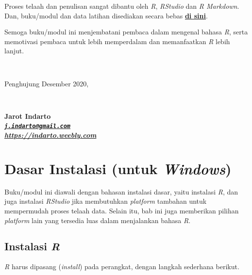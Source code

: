 \documentclass[
  12pt,
  a4paper,
]{scrbook}
\begin{document}
Proses telaah dan penulisan sangat dibantu oleh \emph{R}, \emph{RStudio}
dan \emph{R Markdown}. Dan, buku/modul dan data latihan disediakan
secara bebas
\href{https://indarto.weebly.com/7/9/1/0/7910347/dasar_r.pdf}{\textbf{di
sini}}.

Semoga buku/modul ini menjembatani pembaca dalam mengenal bahasa
\emph{R}, serta memotivasi pembaca untuk lebih memperdalam dan
memanfaatkan \emph{R} lebih lanjut.

~ ~ ~

Penghujung Desember 2020,

~

\textbf{Jarot Indarto}\\
\textbf{\emph{\href{mailto:j.indarto@gmail.com}{\nolinkurl{j.indarto@gmail.com}}}}\\
\textbf{\emph{\url{https://indarto.weebly.com}}}

\newpage

\hypertarget{dasar-instalasi-untuk-windows}{%
\chapter{\texorpdfstring{Dasar Instalasi (untuk
\emph{Windows})}{Dasar Instalasi (untuk Windows)}}\label{dasar-instalasi-untuk-windows}}

Buku/modul ini diawali dengan bahasan instalasi dasar, yaitu instalasi
\emph{R}, dan juga instalasi \emph{RStudio} jika membutuhkan
\emph{platform} tambahan untuk mempermudah proses telaah data. Selain
itu, bab ini juga memberikan pilihan \emph{platform} lain yang tersedia
luas dalam menjalankan bahasa \emph{R}.

\hypertarget{instalasi-r}{%
\section{\texorpdfstring{Instalasi
\emph{R}}{Instalasi R}}\label{instalasi-r}}

\emph{R} harus dipasang (\emph{install}) pada perangkat, dengan langkah
sederhana berikut.
\end{document}
